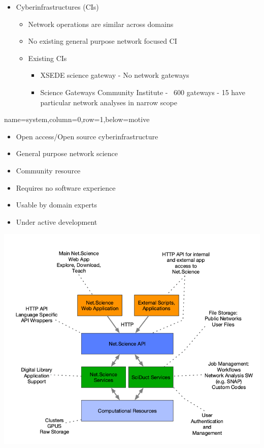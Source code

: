 \documentclass[landscape,paperwidth=70in,paperheight=46in,fontscale=0.225]{baposter} %
\begin{document}
\begin{poster}
{\begin{itemize}[leftmargin=*,noitemsep,topsep=0pt]
\item Cyberinfrastructures (CIs)
	\begin{itemize}
	\item Network operations are similar across domains
	\item No existing general purpose network focused CI
	\item Existing CIs
	\begin{itemize}
	    \item XSEDE science gateway - No network gateways
	    \item Science Gateways Community Institute - ~600 gateways - 15 have
	    particular network analyses in narrow scope
	\end{itemize}
	\end{itemize}
\end{itemize}
\vspace*{0.2in}
}

          {name=system,column=0,row=1,below=motive}{

\begin{minipage}{.5\textwidth}
\begin{itemize}[leftmargin=*,noitemsep,topsep=0pt]
\item Open access/Open source cyberinfrastructure \smallskip
\item General purpose network science \smallskip
\item Community resource \smallskip
\item Requires no software experience \smallskip
\item Usable by domain experts \smallskip
\item Under active development
\end{itemize}
\end{minipage}
\hfill
\begin{minipage}{.5\textwidth}
\begin{center}
\includegraphics[scale=0.22]{figures/sys_descr.png}
\end{center}
\end{minipage}
\vspace*{0.2in}
}


\end{poster}
\end{document}
